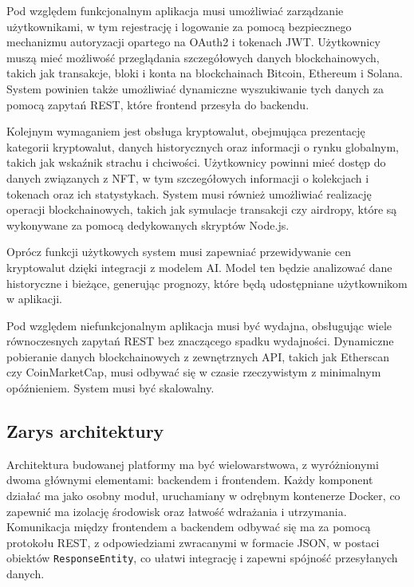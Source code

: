 Pod względem funkcjonalnym aplikacja musi umożliwiać zarządzanie użytkownikami, w tym rejestrację i logowanie za pomocą bezpiecznego mechanizmu autoryzacji opartego na OAuth2 i tokenach JWT. Użytkownicy muszą mieć możliwość przeglądania szczegółowych danych blockchainowych, takich jak transakcje, bloki i konta na blockchainach Bitcoin, Ethereum i Solana. System powinien także umożliwiać dynamiczne wyszukiwanie tych danych za pomocą zapytań REST, które frontend przesyła do backendu.

Kolejnym wymaganiem jest obsługa kryptowalut, obejmująca prezentację kategorii kryptowalut, danych historycznych oraz informacji o rynku globalnym, takich jak wskaźnik strachu i chciwości. Użytkownicy powinni mieć dostęp do danych związanych z NFT, w tym szczegółowych informacji o kolekcjach i tokenach oraz ich statystykach. System musi również umożliwiać realizację operacji blockchainowych, takich jak symulacje transakcji czy airdropy, które są wykonywane za pomocą dedykowanych skryptów Node.js.

Oprócz funkcji użytkowych system musi zapewniać przewidywanie cen kryptowalut dzięki integracji z modelem AI. Model ten będzie analizować dane historyczne i bieżące, generując prognozy, które będą udostępniane użytkownikom w aplikacji.

Pod względem niefunkcjonalnym aplikacja musi być wydajna, obsługując wiele równoczesnych zapytań REST bez znaczącego spadku wydajności. Dynamiczne pobieranie danych blockchainowych z zewnętrznych API, takich jak Etherscan czy CoinMarketCap, musi odbywać się w czasie rzeczywistym z minimalnym opóźnieniem. System musi być skalowalny.

\subsection{Zarys architektury}\label{subsec:ZarysArchitektury}
Architektura budowanej platformy ma być wielowarstwowa, z wyróżnionymi dwoma głównymi elementami: backendem i frontendem. 
Każdy komponent działać ma jako osobny moduł, uruchamiany w odrębnym kontenerze Docker, co zapewnić ma izolację środowisk oraz łatwość wdrażania i utrzymania. Komunikacja między frontendem a backendem odbywać się ma za pomocą protokołu REST, z odpowiedziami zwracanymi w formacie JSON, w postaci obiektów \texttt{ResponseEntity}, co ułatwi integrację i zapewni spójność przesyłanych danych.

